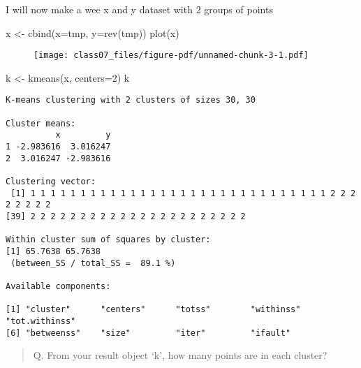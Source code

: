 \documentclass[
  letterpaper,
  DIV=11,
  numbers=noendperiod]{scrartcl}
\newenvironment{Shaded}{\begin{snugshade}}{\end{snugshade}}
\newcommand{\AttributeTok}[1]{\textcolor[rgb]{0.40,0.45,0.13}{#1}}
\newcommand{\DecValTok}[1]{\textcolor[rgb]{0.68,0.00,0.00}{#1}}
\newcommand{\FunctionTok}[1]{\textcolor[rgb]{0.28,0.35,0.67}{#1}}
\newcommand{\NormalTok}[1]{\textcolor[rgb]{0.00,0.23,0.31}{#1}}
\newcommand{\OtherTok}[1]{\textcolor[rgb]{0.00,0.23,0.31}{#1}}
\newcommand{\SpecialCharTok}[1]{\textcolor[rgb]{0.37,0.37,0.37}{#1}}
\begin{document}
I will now make a wee x and y dataset with 2 groups of points

\begin{Shaded}
\begin{Highlighting}[]
\NormalTok{x }\OtherTok{\textless{}{-}} \FunctionTok{cbind}\NormalTok{(}\AttributeTok{x=}\NormalTok{tmp, }\AttributeTok{y=}\FunctionTok{rev}\NormalTok{(tmp))}
\FunctionTok{plot}\NormalTok{(x)}
\end{Highlighting}
\end{Shaded}

\begin{figure}[H]

{\centering \texttt{[image: class07\_files/figure-pdf/unnamed-chunk-3-1.pdf]}

}

\end{figure}

\begin{Shaded}
\begin{Highlighting}[]
\NormalTok{k }\OtherTok{\textless{}{-}} \FunctionTok{kmeans}\NormalTok{(x, }\AttributeTok{centers=}\DecValTok{2}\NormalTok{)}
\NormalTok{k}
\end{Highlighting}
\end{Shaded}

\begin{verbatim}
K-means clustering with 2 clusters of sizes 30, 30

Cluster means:
          x         y
1 -2.983616  3.016247
2  3.016247 -2.983616

Clustering vector:
 [1] 1 1 1 1 1 1 1 1 1 1 1 1 1 1 1 1 1 1 1 1 1 1 1 1 1 1 1 1 1 1 2 2 2 2 2 2 2 2
[39] 2 2 2 2 2 2 2 2 2 2 2 2 2 2 2 2 2 2 2 2 2 2

Within cluster sum of squares by cluster:
[1] 65.7638 65.7638
 (between_SS / total_SS =  89.1 %)

Available components:

[1] "cluster"      "centers"      "totss"        "withinss"     "tot.withinss"
[6] "betweenss"    "size"         "iter"         "ifault"      
\end{verbatim}

\begin{quote}
Q. From your result object `k', how many points are in each cluster?
\end{quote}

\begin{Shaded}
\end{Shaded}
\end{document}
